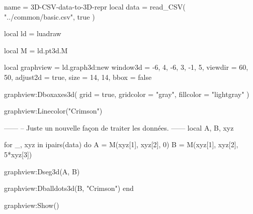 \documentclass[border = 3pt]{standalone}
\begin{document}
\begin{luadraw*}{name = 3D-CSV-data-to-3D-repr}
local data = read_CSV(
  "../common/basic.csv",
  true
)

local ld = luadraw

local M = ld.pt3d.M

local graphview = ld.graph3d:new{
  window3d = {-6, 4, -6, 3, -1, 5},
  viewdir  = {60, 50},
  adjust2d = true,
  size     = {14, 14},
  bbox     = false
}

graphview:Dboxaxes3d({
  grid      = true,
  gridcolor = "gray",
  fillcolor = "lightgray"
})

graphview:Linecolor("Crimson")

------
-- Juste un nouvelle façon de traiter les données.
------
local A, B, xyz

for _, xyz in ipairs(data) do
  A = M(xyz[1], xyz[2], 0)
  B = M(xyz[1], xyz[2], 5*xyz[3])

  graphview:Dseg3d({A, B})

  graphview:Dballdots3d({B}, "Crimson")
end

graphview:Show()
\end{luadraw*}
\end{document}
